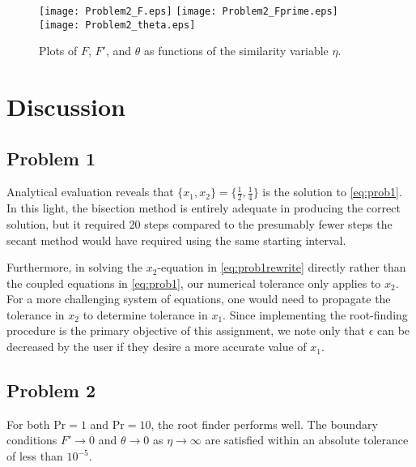 \documentclass[12pt]{article}
\begin{document}
\begin{figure}[h!]
\begin{center}
\texttt{[image: Problem2\_F.eps]}
\texttt{[image: Problem2\_Fprime.eps]}
\texttt{[image: Problem2\_theta.eps]}
\\
\caption{Plots of $F$, $F'$, and $\theta$ as functions of the similarity variable $\eta$.}
\label{fig:prob2_plots}
\end{center}
\end{figure}

\section{Discussion} %

\subsection{Problem 1}

Analytical evaluation reveals that $\{ x_1, x_2 \} = \{ \tfrac{1}{2}, \tfrac{1}{4} \}$ is the solution to \eqref{eq:prob1}. In this light, the bisection method is entirely adequate in producing the correct solution, but it required 20 steps compared to the presumably fewer steps the secant method would have required using the same starting interval.

Furthermore, in solving the $x_2$-equation in \eqref{eq:prob1rewrite} directly rather than the coupled equations in \eqref{eq:prob1}, our numerical tolerance only applies to $x_2$. For a more challenging system of equations, one would need to propagate the tolerance in $x_2$ to determine tolerance in $x_1$. Since implementing the root-finding procedure is the primary objective of this assignment, we note only that $\epsilon$ can be decreased by the user if they desire a more accurate value of $x_1$.

\subsection{Problem 2}

For both $\text{Pr} = 1$ and $\text{Pr} = 10$, the root finder performs well. The boundary conditions $F' \rightarrow 0$ and $\theta \rightarrow 0$ as $\eta \rightarrow \infty$ are satisfied within an absolute tolerance of less than $10^{-5}$.
\end{document}
